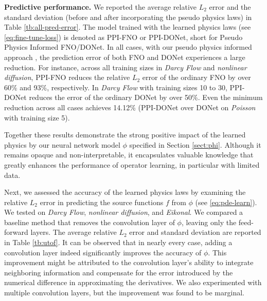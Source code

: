 \noindent\textbf{Predictive performance.} 
We reported the average relative $L_2$ error and the standard deviation (before and after incorporating the pseudo physics laws) in Table \ref{tb:all-pred-error}. The model trained with the learned physics laws (see \eqref{eq:fine-tune-loss}) is denoted as PPI-FNO or PPI-DONet, short for Pseudo Physics Informed FNO/DONet.
In all cases, with our pseudo physics informed approach , the prediction error of both FNO and DONet experiences a large reduction. For instance, across all training sizes in \textit{Darcy Flow} and \textit{nonlinear diffusion}, PPI-FNO reduces the relative $L_2$ error of the ordinary FNO by over 60\% and 93\%, respectively. In \textit{Darcy Flow} with training sizes 10 to 30, PPI-DONet reduces the error of the ordinary DONet by over 50\%. Even the minimum reduction across all cases achieves 14.12\% (PPI-DONet over DONet on \textit{Poisson} with training size 5). 

Together these results demonstrate the strong positive impact of the learned physics by our neural network model $\phi$ specified in Section \ref{sect:phi}. Although it remains opaque and non-interpretable, it encapsulates valuable knowledge that greatly enhances the performance of operator learning, in particular with limited data.

 
Next, we assessed the accuracy of the learned physics laws by examining the relative \(L_2\) error in predicting the source functions \(f\) from \(\phi\) (see \eqref{eq:pde-learn}). We tested on \textit{Darcy Flow}, \textit{nonlinear diffusion}, and \textit{Eikonal}. We compared a baseline method that removes the convolution layer of \(\phi\), leaving only the feed-forward layers. 
The average relative \(L_2\) error and standard deviation are reported in Table \ref{tb:utof}. It can be observed that in nearly every case, adding a convolution layer indeed significantly improves the accuracy of \(\phi\). This improvement might be attributed to the convolution layer's ability to integrate neighboring information and compensate for the error introduced by the numerical difference in approximating  the derivatives. We also experimented with multiple convolution layers, but the improvement was found to be marginal. 

